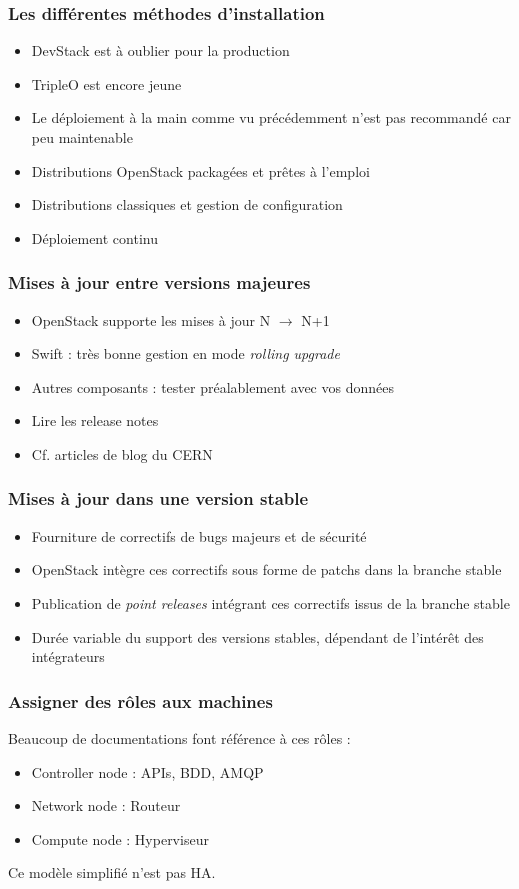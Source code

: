   \begin{frame}
    \frametitle{Les différentes méthodes d'installation}
    \begin{itemize}
      \item DevStack est à oublier pour la production
      \item TripleO est encore jeune
      \item Le déploiement à la main comme vu précédemment n'est pas recommandé car peu maintenable
      \item Distributions OpenStack packagées et prêtes à l'emploi
      \item Distributions classiques et gestion de configuration
      \item Déploiement continu
    \end{itemize}
  \end{frame}

  \begin{frame}
    \frametitle{Mises à jour entre versions majeures}
    \begin{itemize}
      \item OpenStack supporte les mises à jour N $\rightarrow$ N+1
      \item Swift : très bonne gestion en mode \textit{rolling upgrade}
      \item Autres composants : tester préalablement avec vos données
      \item Lire les release notes
      \item Cf. articles de blog du CERN
    \end{itemize}
  \end{frame}

  \begin{frame}
    \frametitle{Mises à jour dans une version stable}
    \begin{itemize}
      \item Fourniture de correctifs de bugs majeurs et de sécurité
      \item OpenStack intègre ces correctifs sous forme de patchs dans la branche stable
      \item Publication de \textit{point releases} intégrant ces correctifs issus de la branche stable
      \item Durée variable du support des versions stables, dépendant de l'intérêt des intégrateurs
    \end{itemize}
  \end{frame}

  \begin{frame}
    \frametitle{Assigner des rôles aux machines}
    Beaucoup de documentations font référence à ces rôles :
    \begin{itemize}
      \item Controller node : APIs, BDD, AMQP
      \item Network node : Routeur
      \item Compute node : Hyperviseur
    \end{itemize}
    Ce modèle simplifié n'est pas HA.
  \end{frame}

